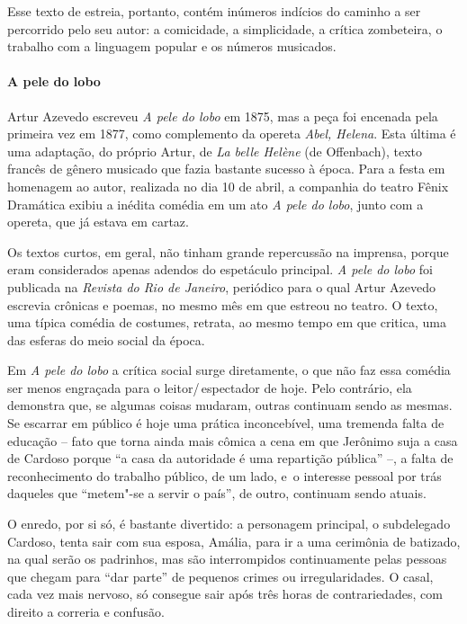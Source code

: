 Esse texto de estreia, portanto, contém inúmeros indícios do caminho a
ser percorrido pelo seu autor: a comicidade, a simplicidade, a crítica
zombeteira, o trabalho com a linguagem popular e os números musicados.

\paragraph{A pele do lobo}
Artur Azevedo escreveu \textit{A pele do lobo} em 1875, mas a peça foi
encenada pela primeira vez em 1877, como complemento da opereta
\textit{Abel, Helena}. Esta última é uma adaptação, do próprio Artur,
de \textit{La belle Helène }(de Offenbach), texto francês de gênero
musicado que fazia bastante sucesso à época. Para a festa em homenagem
ao autor, realizada no dia 10 de abril, a companhia do teatro Fênix
Dramática exibiu a inédita comédia em um ato \textit{A pele do lobo},
junto com a opereta, que já estava em cartaz.

Os textos curtos, em geral, não tinham grande repercussão na imprensa,
porque eram considerados apenas adendos do espetáculo principal.
\textit{A pele do lobo }foi publicada na \textit{Revista do Rio de
Janeiro}, periódico para o qual Artur Azevedo escrevia crônicas e
poemas, no mesmo mês em que estreou no teatro. O texto, uma típica
comédia de costumes, retrata, ao mesmo tempo em que critica, uma das
esferas do meio social da época.

Em \textit{A pele do lobo} a crítica social surge diretamente, o que não
faz essa comédia ser menos engraçada para o leitor/\,espectador de hoje.
Pelo contrário, ela demonstra que, se algumas coisas mudaram, outras
continuam sendo as mesmas. Se escarrar em público é hoje uma prática
inconcebível, uma tremenda falta de educação -- fato que torna ainda
mais cômica a cena em que Jerônimo suja a casa de Cardoso porque “a
casa da autoridade é uma repartição pública” --, a falta de
reconhecimento do trabalho público, de um lado, \mbox{e o} interesse pessoal
por trás daqueles que “metem"-se a servir o país”, de outro, continuam
sendo atuais.

O enredo, por si só, é bastante divertido: a personagem principal, o
subdelegado Cardoso, tenta sair com sua esposa, Amália, para ir a uma
cerimônia de batizado, na qual serão os padrinhos, mas são
interrompidos continuamente pelas pessoas que chegam para “dar parte”
de pequenos crimes ou irregularidades. O casal, cada vez mais nervoso,
só consegue sair após três horas de contrariedades, com direito a
correria e confusão.

